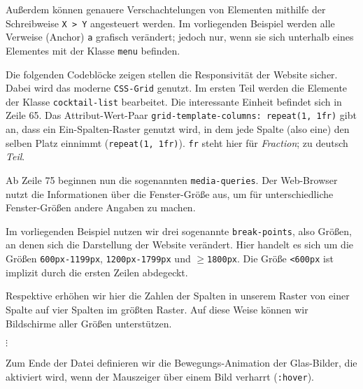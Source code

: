Außerdem können genauere Verschachtelungen von Elementen mithilfe der Schreibweise \texttt{X > Y} angesteuert werden. Im vorliegenden Beispiel werden alle Verweise (Anchor) \texttt{a} grafisch verändert; jedoch nur, wenn sie sich unterhalb eines Elementes mit der Klasse \texttt{menu} befinden.







Die folgenden Codeblöcke zeigen stellen die Responsivität der Website sicher. Dabei wird das moderne \texttt{CSS-Grid} genutzt. Im ersten Teil werden die Elemente der Klasse \texttt{cocktail-list} bearbeitet. Die interessante Einheit befindet sich in Zeile 65. Das Attribut-Wert-Paar \texttt{grid-template-columns: repeat(1, 1fr)} gibt an, dass ein Ein-Spalten-Raster genutzt wird, in dem jede Spalte (also eine) den selben Platz einnimmt (\texttt{repeat(1, 1fr)}). \texttt{fr} steht hier für \textit{Fraction}; zu deutsch \textit{Teil}.

Ab Zeile 75 beginnen nun die sogenannten \texttt{media-queries}. Der Web-Browser nutzt die Informationen über die Fenster-Größe aus, um für unterschiedliche Fenster-Größen andere Angaben zu machen.

Im vorliegenden Beispiel nutzen wir drei sogenannte \texttt{break-points}, also Größen, an denen sich die Darstellung der Website verändert. Hier handelt es sich um die Größen \texttt{600px-1199px}, \texttt{1200px-1799px} und \texttt{$\geq$1800px}. Die Größe \texttt{<600px} ist implizit durch die ersten Zeilen abdegeckt.

Respektive erhöhen wir hier die Zahlen der Spalten in unserem Raster von einer Spalte auf vier Spalten im größten Raster. Auf diese Weise können wir Bildschirme aller Größen unterstützen.



$\vdots$








Zum Ende der Datei definieren wir die Bewegungs-Animation der Glas-Bilder, die aktiviert wird, wenn der Mauszeiger über einem Bild verharrt (\texttt{:hover}).

